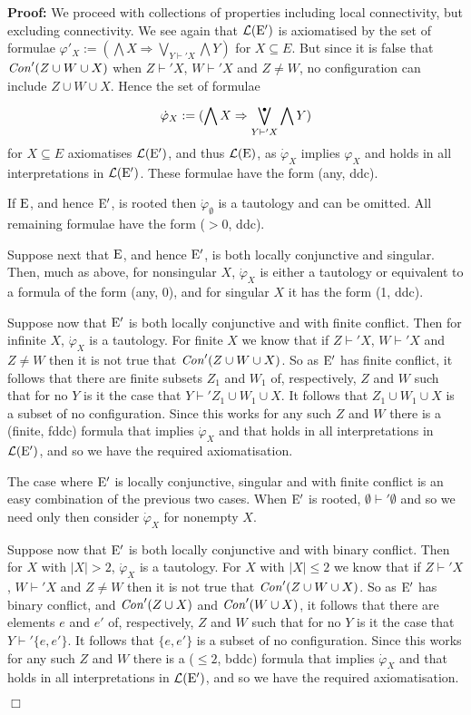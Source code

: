 \documentclass[twocolumn]{article}
\newenvironment{proof}{\begin{trivlist} \item[\hspace{\labelsep}\bf
Proof:]}{\hfill $\Box$\end{trivlist}}
\newcommand{\turn}{\vdash}                              \newcommand{\dbigcup}{\bigcup_{\uparrow}}		\newcommand{\nbigcup}{\bigcup_{\bullet}}		\newcommand{\nbigcap}{\bigcap_{\bullet}}		\newcommand{\bbigcup}{\overline{\bigcup}}		\newcommand{\bbigcap}{\overline{\bigcap}}		\newcommand{\nbbigcap}{\bbigcap_{\bullet}}		\newcommand{\fbbigcup}{\overline{\bigcup}^f}		\newcommand{\bbbigcup}{\overline{\bigcup}^2}		\newcommand{\dcup}{~~\makebox[0pt]{\LARGE$\cdot$}\makebox[0pt]{$\cup$}~~}
\begin{document}
\begin{proof}
We proceed with collections of properties including local
connectivity, but excluding connectivity. We see again that
${\cal L}({\rm E}')$ is axiomatised by the set of formulae 
$\varphi'_X := (\bigwedge X \Rightarrow \bigvee_{Y\turn' X} \bigwedge Y)$
for $X \subseteq E$. But since it is false that ${\it Con}'(Z \cup W \cup X)$
when $Z \turn' X$, $W \turn' X$ and $Z \neq W$, no configuration can
include $Z \cup W \cup X$. Hence the set of formulae 
$${\dot{\varphi}_X := (\bigwedge X \Rightarrow
\bigvee^{\makebox{\raisebox{-11pt}[0pt][0pt]{\Huge$\cdot$}}}_{Y\turn' X}
\bigwedge Y)}$$
for $X \subseteq E$ axiomatises ${\cal L}({\rm E}')$, and thus ${\cal L}({\rm E})$, as
$\dot\varphi_X$ implies $\varphi_X$ and holds in all interpretations
in ${\cal L}({\rm E}')$. These formulae have the form (any, ddc).

If ${\rm E}$, and hence ${\rm E}'$, is rooted then $\dot\varphi_{\emptyset}$ is a tautology
and can be omitted. All remaining formulae have the form ($>\!0$, ddc).
 
Suppose next that ${\rm E}$, and hence ${\rm E}'$, is both locally conjunctive
and singular. Then, much as above, for nonsingular $X$,
$\dot{\varphi}_X$ is either a tautology or equivalent to a formula of
the form (any, 0), and for singular $X$ it has the form (1, ddc).

Suppose now that ${\rm E}'$ is both locally conjunctive and with finite
conflict. Then for infinite $X$, $\dot{\varphi}_X$ is a tautology. For
finite $X$ we know that if $Z \turn' X$, $W \turn' X$ and $Z\neq W$
then it is not true that ${\it Con}'(Z \cup W \cup X)$. So as ${\rm E}'$ has
finite conflict, it follows that there are finite subsets $Z_1$ and
$W_1$ of, respectively, $Z$ and $W$ such that for no $Y$ is it the
case that $Y \turn' Z_1 \cup W_1 \cup X$. It follows that $Z_1 \cup
W_1 \cup X$ is a subset of no configuration. Since this works for any
such $Z$ and $W$ there is a (finite, fddc) formula that implies
$\dot{\varphi}_X$ and that holds in all interpretations in ${\cal L}({\rm E}')$,
and so we have the required axiomatisation.

The case where ${\rm E}'$ is locally conjunctive, singular and with finite
conflict is an easy combination of the previous two cases.  When
${\rm E}'$ is rooted, $\emptyset \turn' \emptyset$ and so we need only then
consider $\dot{\varphi}_X$ for nonempty $X$.

Suppose now that ${\rm E}'$ is both locally conjunctive and with binary
conflict. Then for $X$ with $|X|>2$, $\dot{\varphi}_X$ is a
tautology. For $X$ with $|X|\leq 2$ we know that if $Z \turn'
X$, $W \turn' X$ and $Z\neq W$ then it is not true that ${\it Con}'(Z \cup
W \cup X)$. So as ${\rm E}'$ has binary conflict, and ${\it Con}'(Z \cup X)$
and ${\it Con}'(W \cup X)$, it follows that there are elements $e$ and $e'$
of, respectively, $Z$ and $W$ such that for no $Y$ is it the case that
$Y \turn' \{e,e'\}$. It follows that $ \{e,e'\}$ is a subset of no
configuration. Since this works for any such $Z$ and $W$ there is a
($\leq\!2$, bddc) formula that implies $\dot{\varphi}_X$ and that
holds in all interpretations in ${\cal L}({\rm E}')$, and so we have the required
axiomatisation.


\end{proof}
\end{document}
